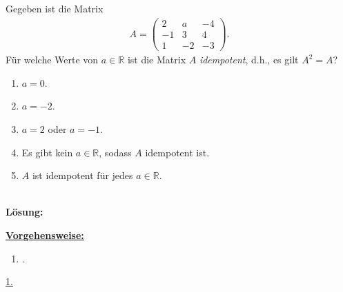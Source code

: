 \subsection*{}
Gegeben ist die Matrix
\begin{align*}
	A
	=
	\begin{pmatrix}
		2 & a & -4 \\
		-1 & 3 & 4\\
		1 & -2 & -3
	\end{pmatrix}.
\end{align*}
Für welche Werte von $ a \in \mathbb{R} $ ist die Matrix $ A $
\textit{idempotent}, d.h., es gilt $ A^2 = A $?
\renewcommand{\labelenumi}{(\alph{enumi})}
\begin{enumerate}
	\item 
	$ a= 0 $.
	\item 
	$ a= -2 $.
	\item
	$ a= 2 $ oder $ a= -1 $.
	\item
	Es gibt kein $ a \in \mathbb{R} $, sodass $ A $ idempotent ist.
	\item
	$ A $ ist idempotent für jedes $ a \in \mathbb{R} $.
\end{enumerate}
\ \\
\textbf{Lösung:}
\begin{mdframed}
\underline{\textbf{Vorgehensweise:}}
\renewcommand{\labelenumi}{\theenumi.}
\begin{enumerate}
\item .
\end{enumerate}
\end{mdframed}

\underline{1. }\\
\newpage

